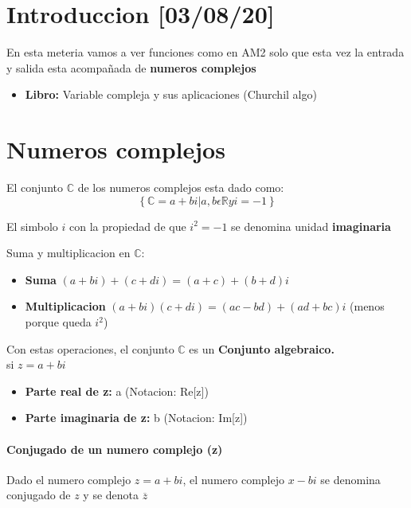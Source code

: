 \documentclass[10pt]{article}
\begin{document}
 
\maketitle

\section{Introduccion [03/08/20]}
En esta meteria vamos a ver funciones como en AM2 solo que esta vez la entrada y salida esta acompañada de \textbf{numeros complejos}
\begin{itemize}
	\item \textbf{Libro:} Variable compleja y sus aplicaciones (Churchil algo)
\end{itemize}

\section{Numeros complejos}
El conjunto $\mathbb C$ de los numeros complejos esta dado como:
\begin{equation*}
	\left\lbrace \mathbb{C}=a+bi   |    a,b    \epsilon \mathbb{R} y i = -1\right\rbrace
\end{equation*}

El simbolo $i$ con la propiedad de que $i^2 = -1$ se denomina unidad \textbf{imaginaria}

Suma y multiplicacion en $\mathbb{C}$:
\begin{itemize}
	\item \textbf{Suma} $(a+bi) + (c+di) = (a+c) + (b+d)i$
	\item \textbf{Multiplicacion} $(a+bi)(c+di) = (ac- bd) + (ad+bc)i$ (menos porque queda $i^2$)
\end{itemize}

Con estas operaciones, el conjunto $\mathbb{C}$ es un \textbf{Conjunto algebraico.}\\

si $z = a+bi$

\begin{itemize}
	\item \textbf{Parte real de z:} a (Notacion: Re[z])
	\item \textbf{Parte imaginaria de z:} b (Notacion: Im[z])
\end{itemize}

\paragraph{Conjugado de un numero complejo (z)}
Dado el numero complejo $z = a+bi$, el numero complejo $x- bi$ se denomina conjugado de $z$ y se denota $\overline{z}$\\
\end{document}
